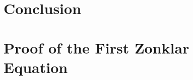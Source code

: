 \documentclass[conference]{IEEEtran}
\begin{document}
\section{Conclusion}
\blindtext






%


\appendices
\section{Proof of the First Zonklar Equation}
\blindtext


\ifCLASSOPTIONcaptionsoff
  \newpage
\fi




\end{document}
